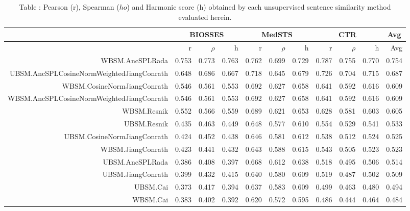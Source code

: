 

\begin{table}[!h]
\centering
\caption{Table \label{table:BioSentenceSimFinalRawOutputFiles}: Pearson (r), Spearman ($
ho$) and Harmonic score (h) obtained by each unsupervised sentence similarity method evaluated herein.} 
\begingroup\tiny
\begin{tabular}{rrrrrrrrrrr}
  \hline \multicolumn{1}{c}{ } & \multicolumn{3}{c}{BIOSSES} & \multicolumn{3}{c}{MedSTS} & \multicolumn{3}{c}{CTR} & \multicolumn{1}{c}{Avg} \\  \hline
 & r & $\rho$ & h & r & $\rho$ & h & r & $\rho$ & h & Avg \\ 
  \hline
WBSM.AncSPLRada & 0.753 & 0.773 & 0.763 & 0.762 & 0.699 & 0.729 & 0.787 & 0.755 & 0.770 & 0.754 \\ 
  UBSM.AncSPLCosineNormWeightedJiangConrath & 0.648 & 0.686 & 0.667 & 0.718 & 0.645 & 0.679 & 0.726 & 0.704 & 0.715 & 0.687 \\ 
  WBSM.CosineNormJiangConrath & 0.546 & 0.561 & 0.553 & 0.692 & 0.627 & 0.658 & 0.641 & 0.592 & 0.616 & 0.609 \\ 
  WBSM.AncSPLCosineNormWeightedJiangConrath & 0.546 & 0.561 & 0.553 & 0.692 & 0.627 & 0.658 & 0.641 & 0.592 & 0.616 & 0.609 \\ 
  WBSM.Resnik & 0.552 & 0.566 & 0.559 & 0.689 & 0.621 & 0.653 & 0.628 & 0.581 & 0.603 & 0.605 \\ 
  UBSM.Resnik & 0.435 & 0.463 & 0.449 & 0.648 & 0.577 & 0.610 & 0.554 & 0.529 & 0.541 & 0.533 \\ 
  UBSM.CosineNormJiangConrath & 0.424 & 0.452 & 0.438 & 0.646 & 0.581 & 0.612 & 0.538 & 0.512 & 0.524 & 0.525 \\ 
  WBSM.JiangConrath & 0.423 & 0.441 & 0.432 & 0.643 & 0.588 & 0.615 & 0.543 & 0.505 & 0.523 & 0.523 \\ 
  UBSM.AncSPLRada & 0.386 & 0.408 & 0.397 & 0.668 & 0.612 & 0.638 & 0.518 & 0.495 & 0.506 & 0.514 \\ 
  UBSM.JiangConrath & 0.399 & 0.432 & 0.415 & 0.640 & 0.580 & 0.609 & 0.519 & 0.487 & 0.502 & 0.509 \\ 
  UBSM.Cai & 0.373 & 0.417 & 0.394 & 0.637 & 0.583 & 0.609 & 0.499 & 0.463 & 0.480 & 0.494 \\ 
  WBSM.Cai & 0.383 & 0.402 & 0.392 & 0.620 & 0.572 & 0.595 & 0.486 & 0.444 & 0.464 & 0.484 \\ 
   \hline
\end{tabular}
\endgroup
\end{table}
